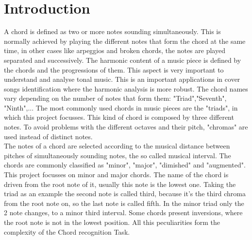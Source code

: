\section{Introduction}
\label{sec:intro}

A chord is defined as two or more notes sounding simultaneously. \cite{benward2014music} This is normally achieved by playing the different notes that form the chord at the same time, in other cases like arpeggios and broken chords, the notes are played separated and successively. The harmonic content of a music piece is defined by the chords and the progressions of them. This aspect is very important to understand and analyse tonal music.\cite{papadopoulos2007large} This is an important applications in cover songs identification where the harmonic analysis is more robust.\cite{lee2006identifying}  The chord names vary depending on the number of notes that form them: "Triad","Seventh", "Ninth",... The most commonly used chords in music pieces are the "triads", in which this project focusses. This kind of chord is composed by three different notes. To avoid problems with the different octaves and their pitch, "chromas" are used instead of distinct notes.\cite{bartsch2005audio}\\ The notes of a chord are selected according to the musical distance between pitches of simultaneously sounding notes, the so called musical interval. The chords are commonly classified as "minor", "major", "dimished" and "augmented". This project focusses on minor and major chords. The name of the chord is driven from the root note of it, usually this note is the lowest one. Taking the triad as an example the second note is called third, because it's the third chroma from the root note on, so the last note is called fifth. In the minor triad only the 2 note changes, to a minor third interval. Some chords present inversions, where the root note is not in the lowest position. All this peculiarities form the complexity of the Chord recognition Task.   